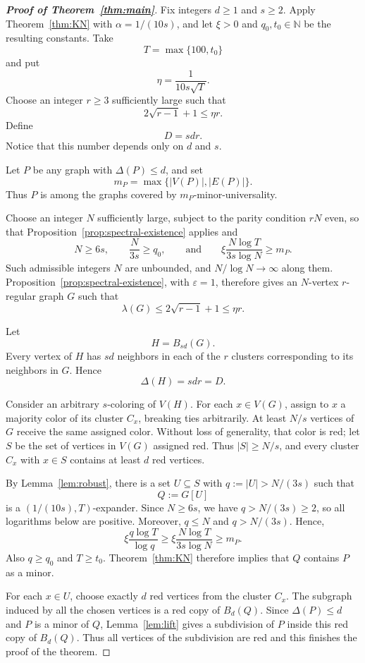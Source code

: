 \documentclass[11pt]{article}
\theoremstyle{definition}
\newcommand{\eps}{\varepsilon}
\begin{document}
\begin{proof}[\textbf{Proof of Theorem~\ref{thm:main}}]
Fix integers $d \ge 1$ and $s\ge2$. Apply Theorem~\ref{thm:KN} with $\alpha=1/(10s)$, and let
$\xi>0$ and $q_0,t_0\in\mathbb{N}$ be the resulting constants. Take
\[
T=\max\{100,t_0\}
\]
and put
\[
\eta=\frac{1}{10s\sqrt{T}}.
\]
Choose an integer $r\ge3$ sufficiently large such that
\begin{equation}\label{eq:r-choice}
2\sqrt{r-1}+1\le\eta r.
\end{equation}
Define
\[
D=sdr.
\]
Notice that this number depends only on $d$ and $s$.

Let $P$ be any graph with $\Delta(P)\le d$, and set
\[
m_P=\max\{|V(P)|,|E(P)|\}.
\]
Thus $P$ is among the graphs covered by $m_P$-minor-universality.

Choose an integer $N$ sufficiently large, subject to the parity condition
$rN$ even, so that Proposition~\ref{prop:spectral-existence} applies and
\begin{equation}\label{eq:N-choice}
N\ge 6s,
\qquad
\frac{N}{3s}\ge q_0,
\qquad\text{and}\qquad
\xi\frac{N\log T}{3s\log N}\ge m_P.
\end{equation}
Such admissible integers $N$ are unbounded, and $N/\log N\to\infty$ along
them. Proposition~\ref{prop:spectral-existence}, with $\eps=1$, therefore
gives an $N$-vertex $r$-regular graph $G$ such that
\[
\lambda(G)\le2\sqrt{r-1}+1\le\eta r.
\]

Let
\[
H=B_{sd}(G).
\]
Every vertex of $H$ has $sd$ neighbors in each of the $r$ clusters
corresponding to its neighbors in $G$. Hence
\[
\Delta(H)=sdr=D.
\]

Consider an arbitrary $s$-coloring of $V(H)$. For each $x\in V(G)$, assign to $x$ a majority color of its cluster $C_x$, breaking ties arbitrarily. At least $N/s$ vertices of $G$ receive the same assigned color. Without loss of generality, that color is red; let $S$ be the set of vertices in $V(G)$ assigned red. Thus $|S|\ge N/s$, and every cluster $C_x$ with $x\in S$ contains at least $d$ red vertices.

By Lemma~\ref{lem:robust}, there is a set $U\subseteq S$ with
$q:=|U|>N/(3s)$ such that
\[
Q:=G[U]
\]
is a $(1/(10s),T)$-expander. Since $N\ge6s$, we have $q>N/(3s)\ge2$, so all
logarithms below are positive. Moreover, $q\le N$ and $q>N/(3s)$. Hence,
\[
\xi\frac{q\log T}{\log q}
 \ge \xi\frac{N\log T}{3s\log N}
 \ge m_P.
\]
Also $q\ge q_0$ and $T\ge t_0$. Theorem~\ref{thm:KN} therefore implies
that $Q$ contains $P$ as a minor.

For each $x\in U$, choose exactly $d$ red vertices from the cluster
$C_x$. The subgraph induced by all the chosen vertices is a red copy of
$B_d(Q)$. Since $\Delta(P)\le d$ and $P$ is a minor of $Q$,
Lemma~\ref{lem:lift} gives a subdivision of $P$ inside this red copy of
$B_d(Q)$. Thus all vertices of the subdivision are red and this finishes the proof of the theorem.
\end{proof}
\end{document}
